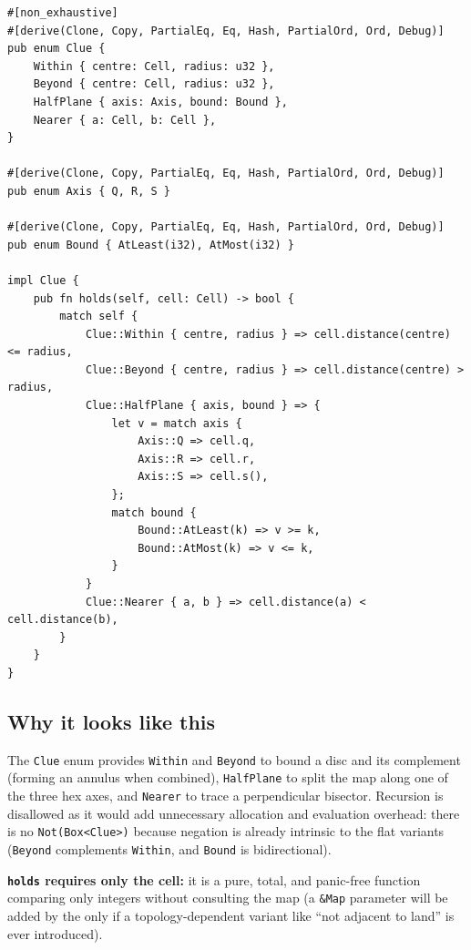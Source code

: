 \documentclass{article}
\begin{document}
\begin{lstlisting}
#[non_exhaustive]
#[derive(Clone, Copy, PartialEq, Eq, Hash, PartialOrd, Ord, Debug)]
pub enum Clue {
    Within { centre: Cell, radius: u32 },
    Beyond { centre: Cell, radius: u32 },
    HalfPlane { axis: Axis, bound: Bound },
    Nearer { a: Cell, b: Cell },
}

#[derive(Clone, Copy, PartialEq, Eq, Hash, PartialOrd, Ord, Debug)]
pub enum Axis { Q, R, S }

#[derive(Clone, Copy, PartialEq, Eq, Hash, PartialOrd, Ord, Debug)]
pub enum Bound { AtLeast(i32), AtMost(i32) }

impl Clue {
    pub fn holds(self, cell: Cell) -> bool {
        match self {
            Clue::Within { centre, radius } => cell.distance(centre) <= radius,
            Clue::Beyond { centre, radius } => cell.distance(centre) > radius,
            Clue::HalfPlane { axis, bound } => {
                let v = match axis {
                    Axis::Q => cell.q,
                    Axis::R => cell.r,
                    Axis::S => cell.s(),
                };
                match bound {
                    Bound::AtLeast(k) => v >= k,
                    Bound::AtMost(k) => v <= k,
                }
            }
            Clue::Nearer { a, b } => cell.distance(a) < cell.distance(b),
        }
    }
}
\end{lstlisting}

\subsection{Why it looks like this}

The \texttt{Clue} enum provides \texttt{Within} and \texttt{Beyond} to bound a disc and its complement (forming an annulus when combined), \texttt{HalfPlane} to split the map along one of the three hex axes, and \texttt{Nearer} to trace a perpendicular bisector.
Recursion is disallowed as it would add unnecessary allocation and evaluation overhead: there is no \texttt{Not(Box<Clue>)} because negation is already intrinsic to the flat variants (\texttt{Beyond} complements \texttt{Within}, and \texttt{Bound} is bidirectional).

\textbf{\texttt{holds} requires only the cell:} it is a pure, total, and panic-free function comparing only integers without consulting the map (a \texttt{\&Map} parameter will be added by the \WG{} only if a topology-dependent variant like ``not adjacent to land'' is ever introduced).
\end{document}
